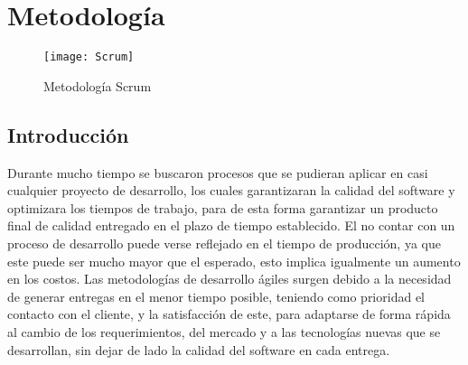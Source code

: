 \chapter{Metodología}

\begin{figure}[th!]
	\centering
	\texttt{[image: Scrum]}
    \caption{Metodología Scrum}
	\label{fig:Scrum}
\end{figure}
\section{Introducción}
Durante mucho tiempo se buscaron procesos  que se pudieran aplicar en casi cualquier proyecto de desarrollo, los cuales garantizaran la calidad del software y optimizara los tiempos de trabajo, para de esta forma garantizar un producto final de calidad entregado en el plazo de tiempo establecido. El no contar con un proceso de desarrollo puede verse reflejado en el tiempo de producción, ya que este puede ser mucho mayor que el esperado, esto implica igualmente un aumento en los costos.
Las metodologías de desarrollo ágiles surgen debido a la necesidad de generar entregas en el menor tiempo posible, teniendo como prioridad el contacto con el cliente, y la satisfacción de este, para adaptarse de forma rápida al cambio de los requerimientos, del mercado  y a las tecnologías nuevas que se desarrollan, sin dejar de lado la calidad del software en cada entrega.
\newpage
